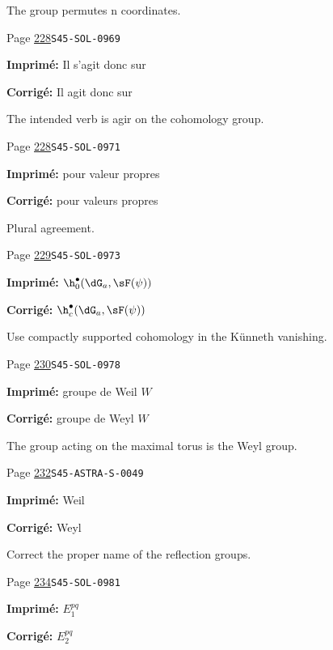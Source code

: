 \begin{description}
\par\noindent The group permutes n coordinates.
\smallskip
\item[\hypertarget{apparatus:FR-0239}{239}] Page \hyperlink{printpage:fr:228}{228}\quad\texttt{S45-SOL-0969}
\par\noindent\textbf{Imprimé:} Il s'agit donc sur
\par\noindent\textbf{Corrigé:} Il agit donc sur
\par\noindent The intended verb is agir on the cohomology group.
\smallskip
\item[\hypertarget{apparatus:FR-0240}{240}] Page \hyperlink{printpage:fr:228}{228}\quad\texttt{S45-SOL-0971}
\par\noindent\textbf{Imprimé:} pour valeur propres
\par\noindent\textbf{Corrigé:} pour valeurs propres
\par\noindent Plural agreement.
\smallskip
\item[\hypertarget{apparatus:FR-0241}{241}] Page \hyperlink{printpage:fr:229}{229}\quad\texttt{S45-SOL-0973}
\par\noindent\textbf{Imprimé:} \(\h_0^\bullet(\dG_a,\sF(\psi))\)
\par\noindent\textbf{Corrigé:} \(\h_c^\bullet(\dG_a,\sF(\psi))\)
\par\noindent Use compactly supported cohomology in the Künneth vanishing.
\smallskip
\item[\hypertarget{apparatus:FR-0242}{242}] Page \hyperlink{printpage:fr:230}{230}\quad\texttt{S45-SOL-0978}
\par\noindent\textbf{Imprimé:} groupe de Weil $W$
\par\noindent\textbf{Corrigé:} groupe de Weyl $W$
\par\noindent The group acting on the maximal torus is the Weyl group.
\smallskip
\item[\hypertarget{apparatus:FR-0243}{243}] Page \hyperlink{printpage:fr:232}{232}\quad\texttt{S45-ASTRA-S-0049}
\par\noindent\textbf{Imprimé:} Weil
\par\noindent\textbf{Corrigé:} Weyl
\par\noindent Correct the proper name of the reflection groups.
\smallskip
\item[\hypertarget{apparatus:FR-0244}{244}] Page \hyperlink{printpage:fr:234}{234}\quad\texttt{S45-SOL-0981}
\par\noindent\textbf{Imprimé:} \(E_1^{p q}\)
\par\noindent\textbf{Corrigé:} \(E_2^{p q}\)

\end{description}
